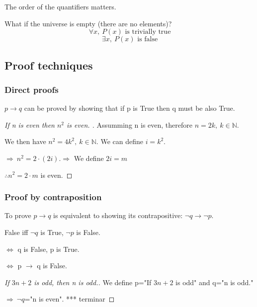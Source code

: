 \documentclass[12pt, a4paper]{book}
\begin{document}
\begin{rem}
    The order of the quantifiers matters.
\end{rem}

\begin{rem}
    What if the universe is empty (there are no elements)?
    $$\forall x, \ P(x) \text{ is trivially true}$$
    $$\exists x, \ P(x) \text{ is false}$$
\end{rem}

\subsection*{Proof techniques}
\subsubsection*{Direct proofs}
$p \rightarrow q$ can be proved by showing that if p is True then q must be also True.

\begin{exmp}
    \begin{proof} [If n is even then $n^2$ is even. ]
        Assumming n is even, therefore $n=2k, \ k \in \mathbb{N}.$ 
        
        We then have $n^2=4k^2, \ k \in \mathbb{N}$. We can define $i=k^2.$
    
        $\Rightarrow \ n^2=2 \cdot (2i). \Rightarrow$ We define $2i=m$ 
        
        $\therefore n^2=2 \cdot m$ is even.
    \end{proof}
\end{exmp}

\subsubsection*{Proof by contraposition}
To prove $p \rightarrow q$ is equivalent to showing its contrapositive: $\lnot q \rightarrow \lnot p$.

False iff $\lnot q$ is True, $\lnot p$ is False.

$\Leftrightarrow$ q is False, p is True.

$\Leftrightarrow$ p $\rightarrow$ q is False.

\begin{exmp}
    \begin{proof}[If $3n+2$ is odd, then n is odd.]


    We define p="If $3n+2$ is odd" and q="n is odd."

    $\Rightarrow \ \lnot q$="n is even".
    *** terminar

    \end{proof}

\end{exmp}
\end{document}
